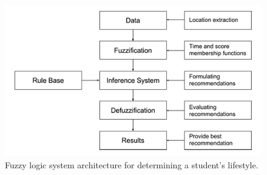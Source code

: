 \documentclass[conference]{IEEEtran}
\begin{document}
\begin{figure}[h!]
\centering
\captionsetup{justification=centering}
\noindent \includegraphics[scale=0.45]{fig1-2}
\caption{Fuzzy logic system architecture for determining a student\rq s lifestyle.}
\end{figure}


%
%

\end{document}
